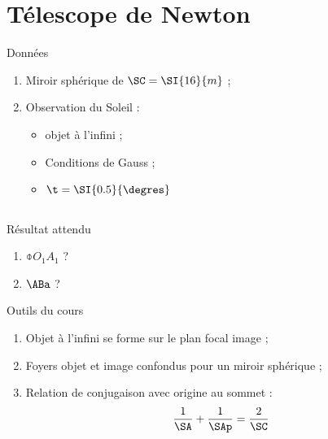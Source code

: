 \documentclass[10pt,notitlepage]{book}
\begin{document}
\section{Télescope de Newton}
\begin{NCdefi}{Données}
    \begin{enumerate}
        \item Miroir sphérique de $\SC = \SI{16}{m}$ ;
        \item Observation du Soleil :
            \begin{itemize}
                \item objet à l'infini ;
                \item Conditions de Gauss ;
                \item $\t = \SI{0.5}{\degres}$
            \end{itemize}
    \end{enumerate}
\end{NCdefi}

\subsection{}

\begin{NCprop}{Résultat attendu}
    \begin{enumerate}
        \item $\obar{O_1A_1}$ ?
        \item $\ABa$ ?
    \end{enumerate}
\end{NCprop}

\begin{NCdemo}{Outils du cours}
    \begin{enumerate}
        \item Objet à l'infini se forme sur le plan focal image ;
        \item Foyers objet et image confondus pour un miroir sphérique ;
        \item Relation de conjugaison avec origine au sommet :
            \[ \frac{1}{\SA} + \frac{1}{\SAp} = \frac{2}{\SC} \]
    \end{enumerate}
\end{NCdemo}
\end{document}
